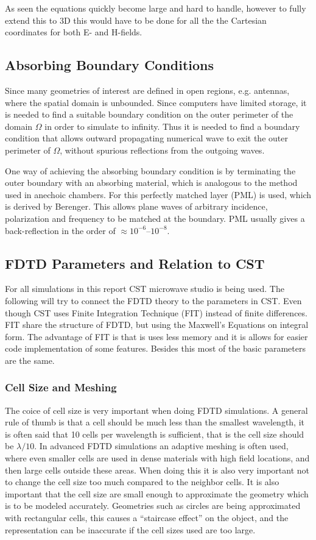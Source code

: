 As seen the equations quickly become large and hard to handle, however to fully extend this to 3D this would have to be done for all the the Cartesian coordinates for both E- and H-fields. 

\subsection{Absorbing Boundary Conditions}
Since many geometries of interest are defined in open regions, e.g. antennas, where the spatial domain is unbounded. Since computers have limited storage, it is needed to find a suitable boundary condition on the outer perimeter of the domain $\Omega$ in order to simulate to infinity. Thus it is needed to find a boundary condition that allows outward propagating numerical wave to exit the outer perimeter of $\Omega$, without spurious reflections from the outgoing waves. 

One way of achieving the absorbing boundary condition is by terminating the outer boundary with an absorbing material, which is analogous to the method used in anechoic chambers. For this perfectly matched layer (PML) is used, which is derived by Berenger. This allows plane waves of arbitrary incidence, polarization and frequency to be matched at the boundary. PML usually gives a back-reflection in the order of $\approx 10^{-6}$--$10^{-8}$.

\subsection{FDTD Parameters and Relation to CST}
For all simulations in this report CST microwave studio is being used. The following will try to connect the FDTD theory to the parameters in CST. Even though CST uses Finite Integration Technique (FIT) instead of finite differences. FIT share the structure of FDTD, but using the Maxwell's Equations on integral form. The advantage of FIT is that is uses less memory and it is allows for easier code implementation of some features. Besides this most of the basic parameters are the same. 

\subsubsection{Cell Size and Meshing}
The coice of cell size is very important when doing FDTD simulations. A general rule of thumb is that a cell should be much less than the smallest wavelength, it is often said that 10 cells per wavelength is sufficient, that is the cell size should be $\lambda/10$. In advanced FDTD simulations an adaptive meshing is often used, where even smaller cells are used in dense materials with high field locations, and then large cells outside these areas. When doing this it is also very important not to change the cell size too much compared to the neighbor cells. It is also important
that the cell size are small enough to approximate the geometry which is to be modeled accurately. Geometries such as circles are being approximated with rectangular cells, this causes a ``staircase effect'' on the object, and the representation can be inaccurate if the cell sizes used are too large. 

